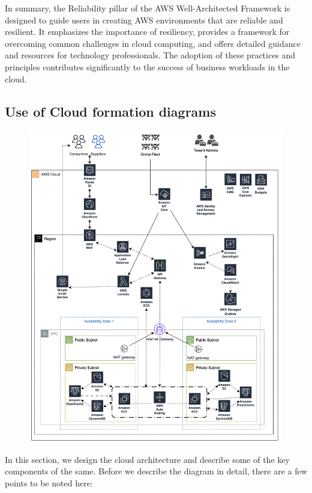 \documentclass{article}
\begin{document}
In summary, the Reliability pillar of the AWS Well-Architected Framework is designed to guide users in creating AWS environments that are reliable and resilient. It emphasizes the importance of resiliency, provides a framework for overcoming common challenges in cloud computing, and offers detailed guidance and resources for technology professionals. The adoption of these practices and principles contributes significantly to the success of business workloads in the cloud.

\subsection{Use of Cloud formation diagrams}
\begin{figure}[H]
    \centering
    \includegraphics[width=1.1\linewidth]{images/architecture.png}
\end{figure}
In this section, we design the cloud architecture and describe some of the key components of the same. Before we describe the diagram in detail, there are a few points to be noted here:
\end{document}
